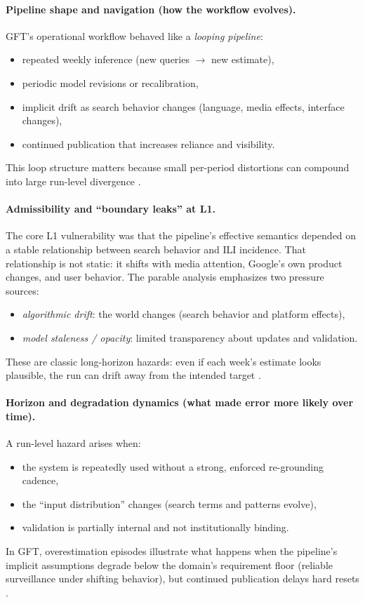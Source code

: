 \paragraph{Pipeline shape and navigation (how the workflow evolves).}
GFT’s operational workflow behaved like a \emph{looping pipeline}:
\begin{itemize}
  \item repeated weekly inference (new queries $\rightarrow$ new estimate),
  \item periodic model revisions or recalibration,
  \item implicit drift as search behavior changes (language, media effects, interface changes),
  \item continued publication that increases reliance and visibility.
\end{itemize}
This loop structure matters because small per-period distortions can compound into large run-level divergence \cite{Lazer2014Science}.

\paragraph{Admissibility and “boundary leaks” at L1.}
The core L1 vulnerability was that the pipeline’s effective semantics depended on a stable relationship between search behavior and ILI incidence. That relationship is not static: it shifts with media attention, Google’s own product changes, and user behavior. The parable analysis emphasizes two pressure sources:
\begin{itemize}
  \item \emph{algorithmic drift}: the world changes (search behavior and platform effects),
  \item \emph{model staleness / opacity}: limited transparency about updates and validation.
\end{itemize}
These are classic long-horizon hazards: even if each week’s estimate looks plausible, the run can drift away from the intended target \cite{Lazer2014Science,Olson2013PLOSCompBio}.

\paragraph{Horizon and degradation dynamics (what made error more likely over time).}
A run-level hazard arises when:
\begin{itemize}
  \item the system is repeatedly used without a strong, enforced re-grounding cadence,
  \item the “input distribution” changes (search terms and patterns evolve),
  \item validation is partially internal and not institutionally binding.
\end{itemize}
In GFT, overestimation episodes illustrate what happens when the pipeline’s implicit assumptions degrade below the domain’s requirement floor (reliable surveillance under shifting behavior), but continued publication delays hard resets \cite{Butler2013Nature,Lazer2014Science}.

